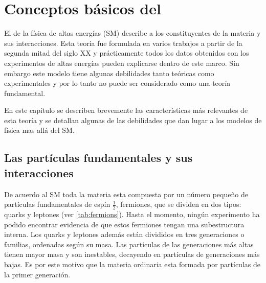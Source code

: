 \chapter{Conceptos básicos del \SM}
\label{cap:sm}

El {\SM} de la física de altas energías (SM) describe a los
constituyentes de la materia y sus interacciones. Esta teoría fue formulada en
varios trabajos a partir de la segunda mitad del siglo XX y prácticamente todos
los datos obtenidos con los experimentos de altas energías pueden explicarse
dentro de este marco. Sin embargo este modelo tiene algunas debilidades tanto
teóricas como experimentales y por lo tanto no puede ser considerado como una
teoría fundamental.

En este capítulo se describen brevemente las características más relevantes de
esta teoría y se detallan algunas de las debilidades que dan lugar a
los modelos de física mas allá del SM.


\section{Las partículas fundamentales y sus interacciones}

De acuerdo al SM toda la materia esta compuesta por un número peque\~no de
partículas fundamentales de espín $\frac{1}{2}$, fermiones, que se
dividen en dos tipos: quarks y leptones (ver \cref{tab:fermions}). Hasta el
momento, ningún experimento ha podido encontrar evidencia de que estos fermiones
tengan una subestructura interna. Los quarks y leptones además están divididos
en tres generaciones o familias, ordenadas según su masa. Las partículas
de las generaciones más altas tienen mayor masa y son inestables, decayendo
en partículas de generaciones más bajas. Es por este motivo que la materia
ordinaria esta formada por partículas de la primer generación.

